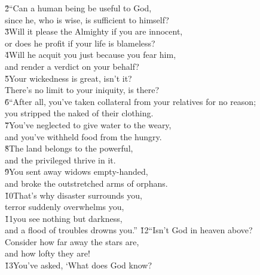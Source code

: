 \begin{poetry}
\poeml \v{2}``Can a human being be useful to God, \\
\poemll    since he, who is wise, is sufficient to himself? \\
\poeml \v{3}Will it please the Almighty if you are innocent, \\
\poemll    or does he profit if your life is blameless? \\
\poeml \v{4}Will he acquit you just because you fear him, \\
\poemll    and render a verdict on your behalf? \\
\poeml \v{5}Your wickedness is great, isn't it? \\
\poemll    There's no limit to your iniquity, is there? \\
\poeml \v{6}``After all, you've taken collateral from your relatives for no reason; \\
\poemll    you stripped the naked of their clothing. \\
\poeml \v{7}You've neglected to give water to the weary, \\
\poemll    and you've withheld food from the hungry. \\
\poeml \v{8}The land belongs to the powerful, \\
\poemll    and the privileged thrive in it. \\
\poeml \v{9}You sent away widows empty-handed, \\
\poemll    and broke the outstretched arms of orphans. \\
\poeml \v{10}That's why disaster surrounds you, \\
\poemll    terror suddenly overwhelms you, \\
\poeml \v{11}you see nothing but darkness, \\
\poemll    and a flood of troubles drowns you.''
\poeml \v{12}``Isn't God in heaven above? \\
\poemll    Consider how far away the stars are, \\
\poemlll       and how lofty they are! \\
\poeml \v{13}You've asked, `What does God know? \\

\end{poetry}

